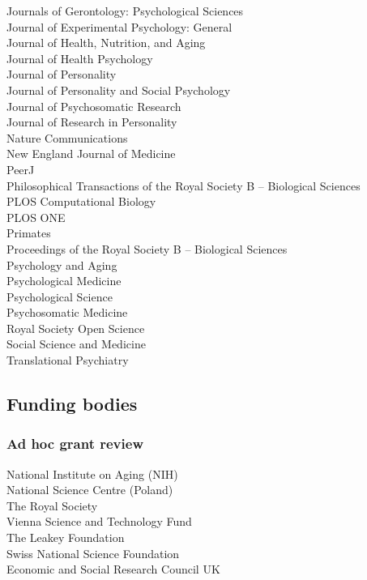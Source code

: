 \documentclass[11pt]{article}
\begin{document}
\begin{minipage}[t]{0.49\linewidth}
Journals of Gerontology: Psychological Sciences \\
Journal of Experimental Psychology: General \\
Journal of Health, Nutrition, and Aging \\
Journal of Health Psychology \\
Journal of Personality \\
Journal of Personality and Social Psychology \\
Journal of Psychosomatic Research \\
Journal of Research in Personality \\
Nature Communications \\
New England Journal of Medicine \\
PeerJ \\
Philosophical Transactions of the Royal Society B -- Biological Sciences \\
PLOS Computational Biology \\
PLOS ONE \\
Primates \\
Proceedings of the Royal Society B -- Biological Sciences \\
Psychology and Aging \\
Psychological Medicine \\
Psychological Science \\
Psychosomatic Medicine \\
Royal Society Open Science \\
Social Science and Medicine \\
Translational Psychiatry
\end{minipage}

\subsection*{Funding bodies}

\subsubsection*{Ad hoc grant review}
National Institute on Aging (NIH) \\
National Science Centre (Poland) \\
The Royal Society \\
Vienna Science and Technology Fund \\
The Leakey Foundation \\
Swiss National Science Foundation \\
Economic and Social Research Council UK
\end{document}
